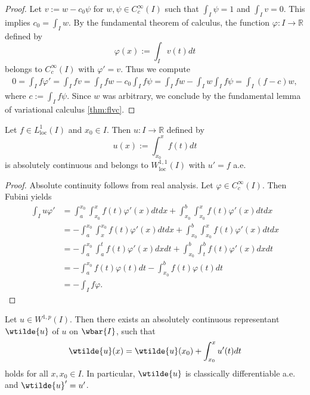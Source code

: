 \begin{proof}
	Let $v := w - c_0 \psi$ for $w,\psi \in C^\infty_c(I)$ such that $\int_I \psi = 1$ and $\int_I v = 0$. This implies $c_0 = \int_I w$. By the fundamental theorem of calculus, the function $\varphi : I \to \mathbb{R}$ defined by
	\begin{equation*}
		\varphi(x) := \int_I v(t) dt
	\end{equation*}
	\noindent belongs to $C^\infty_c(I)$ with $\varphi' = v$. Thus we compute
	\begin{align*}
		0 = \int_I f \varphi' = \int_I f v = \int_I fw - c_0 \int_I f \psi = \int_I fw - \int_I w \int_I f \psi = \int_I (f - c)w,
	\end{align*}
	\noindent where $c := \int_I f \psi$. Since $w$ was arbitrary, we conclude by the fundamental lemma of variational calculus \ref{thm:flvc}.
\end{proof}

\begin{lemma}
	\label{lem:abscontint}
	Let $f \in L^1_{\mathrm{loc}}(I)$ and $x_0 \in I$. Then $u : I \to \mathbb{R}$ defined by
	\begin{equation*}
		u(x) := \int_{x_0}^x f(t)dt
	\end{equation*}
	\noindent is absolutely continuous and belongs to $W^{1,1}_{\mathrm{loc}}(I)$ with $u' = f$ a.e.
\end{lemma}

\begin{proof}
	Absolute continuity follows from real analysis. Let $\varphi \in C^\infty_c(I)$. Then Fubini yields
	\begin{align*}
		\int_I u\varphi' &= \int_a^{x_0}\int_{x_0}^x f(t)\varphi'(x)dtdx + \int_{x_0}^b \int_{x_0}^x f(t)\varphi'(x)dtdx\\
		&= -\int_a^{x_0}\int_x^{x_0} f(t)\varphi'(x)dtdx + \int_{x_0}^b \int_{x_0}^x f(t)\varphi'(x)dtdx\\
		&= -\int_a^{x_0}\int_a^t f(t)\varphi'(x)dxdt + \int_{x_0}^b \int_t^b f(t)\varphi'(x)dxdt\\
		&= -\int_a^{x_0} f(t)\varphi(t)dt - \int_{x_0}^b f(t)\varphi(t)dt\\
		&= -\int_I f \varphi.
	\end{align*}
\end{proof}

\begin{theorem}
	\label{thm:W1p}
	Let $u \in W^{1,p}(I)$. Then there exists an absolutely continuous representant $\wtilde{u}$ of $u$ on $\wbar{I}$, such that
	\begin{equation*}
		\wtilde{u}(x) = \wtilde{u}(x_0) + \int_{x_0}^x u'(t)dt
	\end{equation*}
	\noindent holds for all $x,x_0 \in I$. In particular, $\wtilde{u}$ is classically differentiable a.e. and $\wtilde{u}' = u'$.
\end{theorem}

